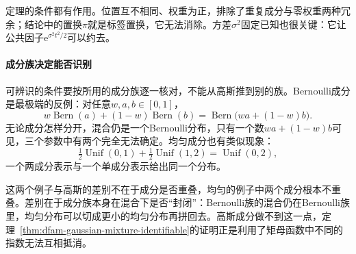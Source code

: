 定理的条件都有作用。位置互不相同、权重为正，排除了重复成分与零权重两种冗余；结论中的置换$\pi$就是标签置换，它无法消除。方差$\sigma^{2}$固定已知也很关键：它让公共因子$\mathrm{e}^{\sigma^{2}t^{2}/2}$可以约去。

\paragraph{成分族决定能否识别}
可辨识的条件要按所用的成分族逐一核对，不能从高斯推到别的族。Bernoulli成分是最极端的反例：对任意$w,a,b\in[0,1]$，
\[
  w\operatorname{Bern}(a)+(1-w)\operatorname{Bern}(b)=\operatorname{Bern}\bigl(wa+(1-w)b\bigr).
\]
无论成分怎样分开，混合仍是一个Bernoulli分布，只有一个数$wa+(1-w)b$可见，三个参数中有两个完全无法确定。均匀成分也有类似现象：
\[
  \tfrac12\operatorname{Unif}(0,1)+\tfrac12\operatorname{Unif}(1,2)=\operatorname{Unif}(0,2),
\]
一个两成分表示与一个单成分表示给出同一个分布。

这两个例子与高斯的差别不在于成分是否重叠，均匀的例子中两个成分根本不重叠。差别在于成分族本身在混合下是否“封闭”：Bernoulli族的混合仍在Bernoulli族里，均匀分布可以切成更小的均匀分布再拼回去。高斯成分做不到这一点，定理~\ref{thm:dfam-gaussian-mixture-identifiable}的证明正是利用了矩母函数中不同的指数无法互相抵消。
